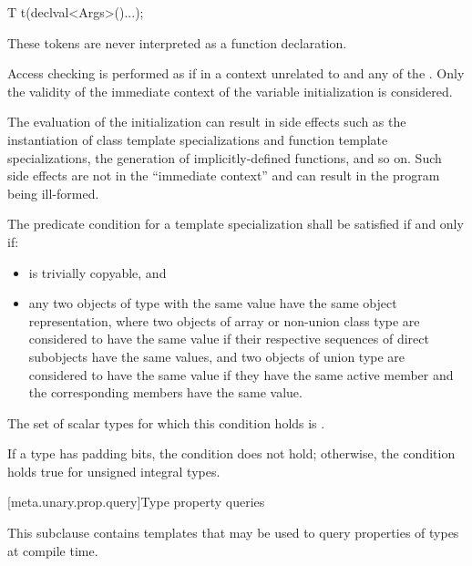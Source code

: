 \begin{codeblock}
T t(declval<Args>()...);
\end{codeblock}

\begin{note} These tokens are never interpreted as a function declaration.
\end{note} Access checking is performed as if in a context unrelated to 
and any of the . Only the validity of the immediate context of the
variable initialization is considered. \begin{note} The evaluation of the
initialization can result in side effects such as the instantiation of class
template specializations and function template specializations, the generation
of implicitly-defined functions, and so on. Such side effects are not in the
``immediate context'' and can result in the program being ill-formed. \end{note}

%
\pnum
The predicate condition for a template specialization
shall be satisfied if and only if:
\begin{itemize}
\item {} is trivially copyable, and
\item any two objects of type  with the same value
have the same object representation, where
two objects of array or non-union class type are considered to have the same value
if their respective sequences of direct subobjects have the same values, and
two objects of union type are considered to have the same value
if they have the same active member and the corresponding members have the same value.
\end{itemize}
The set of scalar types for which this condition holds is
.
\begin{note} If a type has padding bits, the condition does not hold;
otherwise, the condition holds true for unsigned integral types. \end{note}

[meta.unary.prop.query]{Type property queries}

\pnum
This subclause contains templates that may be used to query
properties of types at compile time.


